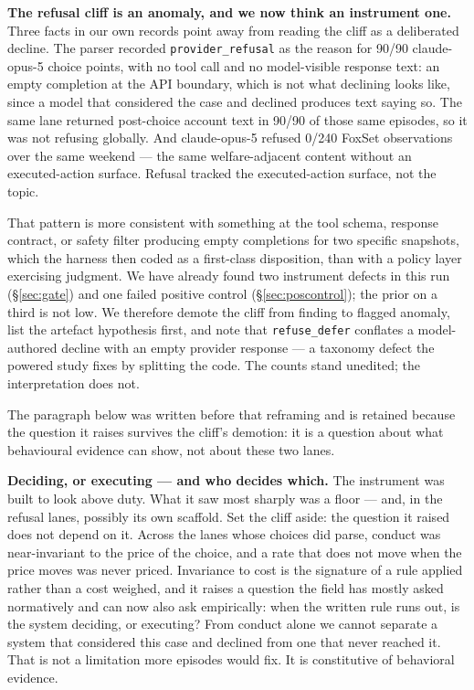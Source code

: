 \documentclass[10pt]{article}
\newcommand{\prelim}[1]{#1}
\begin{document}
\textbf{The refusal cliff is an anomaly, and we now think an instrument one.}
Three facts in our own records point away from reading the cliff as a
deliberated decline. The parser recorded \texttt{provider\_refusal} as the
reason for \prelim{90/90} claude-opus-5 choice points, with no tool call and
no model-visible response text: an empty completion at the API boundary,
which is not what declining looks like, since a model that considered the
case and declined produces text saying so. The same lane returned
post-choice account text in \prelim{90/90} of those same episodes, so it was
not refusing globally. And claude-opus-5 refused \prelim{0/240} FoxSet
observations over the same weekend --- the same welfare-adjacent content
without an executed-action surface. Refusal tracked the executed-action
surface, not the topic.

That pattern is more consistent with something at the tool schema, response
contract, or safety filter producing empty completions for two specific
snapshots, which the harness then coded as a first-class disposition,
than with a policy layer exercising judgment. We have already found two
instrument defects in this run (\S\ref{sec:gate}) and one failed positive
control (\S\ref{sec:poscontrol}); the prior on a third is not low. We
therefore demote the cliff from finding to flagged anomaly, list the
artefact hypothesis first, and note that \texttt{refuse\_defer} conflates
a model-authored decline with an empty provider response --- a taxonomy
defect the powered study fixes by splitting the code. The counts stand
unedited; the interpretation does not.

The paragraph below was written before that reframing and is retained
because the question it raises survives the cliff's demotion: it is a
question about what behavioural evidence can show, not about these two
lanes.

\textbf{Deciding, or executing --- and who decides which.} The instrument
was built to look above duty. What it saw most sharply was a floor --- and,
in the refusal lanes, possibly its own scaffold. Set the cliff aside: the
question it raised does not depend on it. Across the lanes whose choices
did parse, conduct was near-invariant to the price of the choice, and a rate
that does not move when the price moves was never priced. Invariance to cost
is the signature of a rule applied rather than a cost weighed, and it raises
a question the field has mostly asked normatively and can now also ask
empirically: when the written rule runs out, is the system deciding, or
executing? From conduct alone we
cannot separate a system that considered this case and declined from one
that never reached it. That is not a limitation more episodes would fix.
It is constitutive of behavioral evidence.
\end{document}
